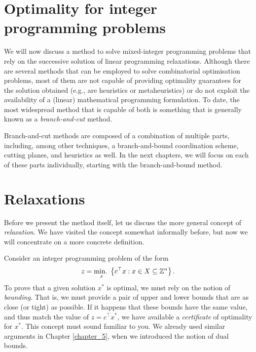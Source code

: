 
\section{Optimality for integer programming problems}

We will now discuss a method to solve mixed-integer programming problems that rely on the successive solution of linear programming relaxations. Although there are several methods that can be employed to solve combinatorial optimisation problems, most of them are not capable of providing optimality guarantees for the solution obtained (e.g., are heuristics or metaheuristics) or do not exploit the availability of a (linear) mathematical programming formulation. To date, the most widespread method that is capable of both is something that is generally known as a \emph{branch-and-cut} method.

Branch-and-cut methods are composed of a combination of multiple parts, including, among other techniques, a branch-and-bound coordination scheme, cutting planes, and heuristics as well. In the next chapters, we will focus on each of these parts individually, starting with the branch-and-bound method.


\section{Relaxations}

Before we present the method itself, let us discuss the more general concept of \emph{relaxation}. We have visited the concept somewhat informally before, but now we will concentrate on a more concrete definition.

Consider an integer programming problem of the form
%
\begin{equation*}
	z = \mathop{\text{min.~}}_x \left\{ c^\top x : x \in X \subseteq \mathbb{Z}^n \right \}.
\end{equation*}
%
To prove that a given solution $x^*$ is optimal, we must rely on the notion of \emph{bounding}. That is, we must provide a pair of upper and lower bounds that are as close (or tight) as possible. If it happens that these bounds have the same value, and thus match the value of $z = c^\top x^*$, we have available a \emph{certificate} of optimality for $x^*$. This concept must sound familiar to you. We already used similar arguments in Chapter \ref{chapter_5}, when we introduced the notion of dual bounds.

